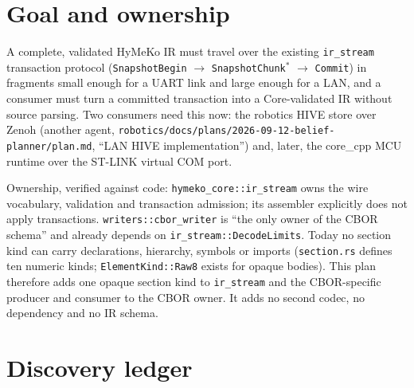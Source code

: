 \documentclass[11pt,a4paper]{article}
\begin{document}
\section{Goal and ownership}

A complete, validated HyMeKo IR must travel over the existing \texttt{ir\_stream} transaction protocol
(\texttt{SnapshotBegin} $\to$ \texttt{SnapshotChunk}$^{*}$ $\to$ \texttt{Commit}) in fragments small enough for a
UART link and large enough for a LAN, and a consumer must turn a committed transaction into a Core-validated IR
without source parsing. Two consumers need this now: the robotics HIVE store over Zenoh (another agent,
\texttt{robotics/docs/plans/2026-09-12-belief-planner/plan.md}, ``LAN HIVE implementation'') and, later, the
core\_cpp MCU runtime over the ST-LINK virtual COM port.

Ownership, verified against code: \texttt{hymeko\_core::ir\_stream} owns the wire vocabulary, validation and
transaction admission; its assembler explicitly does not apply transactions. \texttt{writers::cbor\_writer} is ``the
only owner of the CBOR schema'' and already depends on \texttt{ir\_stream::DecodeLimits}. Today no section kind can
carry declarations, hierarchy, symbols or imports (\texttt{section.rs} defines ten numeric kinds;
\texttt{ElementKind::Raw8} exists for opaque bodies). This plan therefore adds one opaque section kind to
\texttt{ir\_stream} and the CBOR-specific producer and consumer to the CBOR owner. It adds no second codec, no
dependency and no IR schema.

\section{Discovery ledger}
\end{document}

